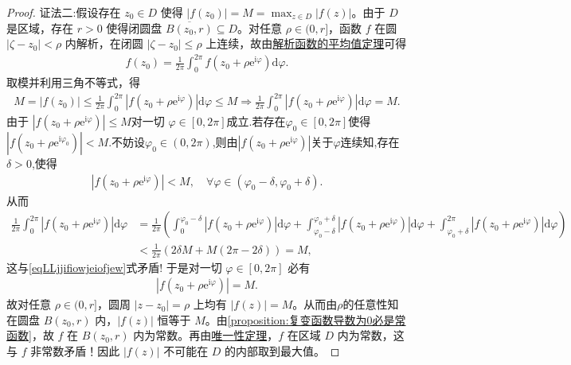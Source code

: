 \documentclass[../../main.tex]{subfiles}%
\begin{document}
\begin{proof}
{\color{blue}证法二:}假设存在 \(z_0 \in D\) 使得 \(|f(z_0)| = M = \max_{z \in D} |f(z)|\)。由于 \(D\) 是区域，存在 \(r > 0\) 使得闭圆盘 \(\overline{B(z_0, r)} \subseteq D\)。对任意 \(\rho \in (0, r]\)，函数 \(f\) 在圆 \(|\zeta - z_0| < \rho\) 内解析，在闭圆 \(|\zeta - z_0| \leqslant \rho\) 上连续，故由\hyperref[theorem:解析函数的平均值定理]{解析函数的平均值定理}可得
\begin{align*}
f(z_0) = \frac{1}{2\pi} \int_{0}^{2\pi} f(z_0 + \rho \mathrm{e}^{\mathrm{i}\varphi}) \mathrm{d}\varphi.
\end{align*}
取模并利用三角不等式，得
\begin{align}\label{eqLLjjifiowjeiofjew}
M = |f(z_0)| \leqslant \frac{1}{2\pi} \int_{0}^{2\pi} |f(z_0 + \rho \mathrm{e}^{\mathrm{i}\varphi})| \mathrm{d}\varphi \leqslant M\Longrightarrow \frac{1}{2\pi} \int_{0}^{2\pi} |f(z_0 + \rho \mathrm{e}^{\mathrm{i}\varphi})| \mathrm{d}\varphi=M.
\end{align}
由于 \(|f(z_0 + \rho \mathrm{e}^{\mathrm{i}\varphi})| \leqslant M\)对一切 \(\varphi \in [0, 2\pi]\)成立.若存在$\varphi_0\in [0,2\pi]$使得$|f(z_0 + \rho \mathrm{e}^{\mathrm{i}\varphi_0})| < M$.不妨设$\varphi_0\in (0,2\pi)$,则由$|f(z_0 + \rho \mathrm{e}^{\mathrm{i}\varphi})|$关于$\varphi$连续知,存在$\delta>0$,使得
\begin{align*}
|f(z_0 + \rho \mathrm{e}^{\mathrm{i}\varphi})|<M,\quad \forall \varphi\in (\varphi_0-\delta,\varphi_0+\delta).
\end{align*}
从而
\begin{align*}
\frac{1}{2\pi}\int_0^{2\pi}{\left| f\left( z_0+\rho \mathrm{e}^{\mathrm{i}\varphi} \right) \right|\mathrm{d}\varphi}&=\frac{1}{2\pi}\left( \int_0^{\varphi _0-\delta}{\left| f\left( z_0+\rho \mathrm{e}^{\mathrm{i}\varphi} \right) \right|\mathrm{d}\varphi}+\int_{\varphi _0-\delta}^{\varphi _0+\delta}{\left| f\left( z_0+\rho \mathrm{e}^{\mathrm{i}\varphi} \right) \right|\mathrm{d}\varphi}+\int_{\varphi _0+\delta}^{2\pi}{\left| f\left( z_0+\rho \mathrm{e}^{\mathrm{i}\varphi} \right) \right|\mathrm{d}\varphi} \right) 
\\
&<\frac{1}{2\pi}\left( 2\delta M+M\left( 2\pi -2\delta \right) \right) =M,
\end{align*}
这与\eqref{eqLLjjifiowjeiofjew}式矛盾!
于是对一切 \(\varphi \in [0, 2\pi]\) 必有
\begin{align*}
|f(z_0 + \rho \mathrm{e}^{\mathrm{i}\varphi})| = M.
\end{align*}
故对任意 \(\rho \in (0, r]\)，圆周 \(|z - z_0| = \rho\) 上均有 \(|f(z)| = M\)。从而由$\rho$的任意性知在圆盘 \(B(z_0, r)\) 内，\(|f(z)|\) 恒等于 \(M\)。由\cref{proposition:复变函数导数为0必是常函数}，故 \(f\) 在 \(B(z_0, r)\) 内为常数。再由\hyperref[theorem:复变函数--唯一性定理]{唯一性定理}，\(f\) 在区域 \(D\) 内为常数，这与 \(f\) 非常数矛盾！因此 \(|f(z)|\) 不可能在 \(D\) 的内部取到最大值。
\end{proof}
\end{document}
